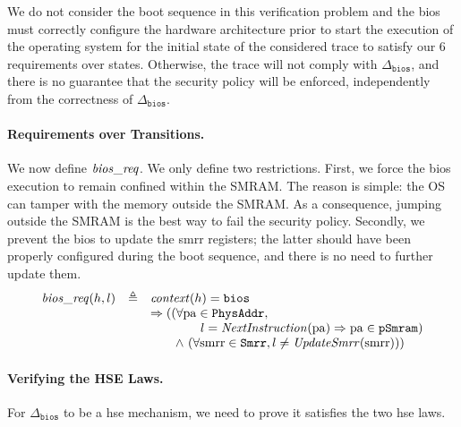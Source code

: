 We do not consider the boot sequence in this verification problem and the
\ac{bios} must correctly configure the hardware architecture prior to start the
execution of the operating system for the initial state of the considered trace
to satisfy our 6 requirements over states.
%
Otherwise, the trace will not comply with \( \Delta_{\mathtt{bios}} \), and
there is no guarantee that the security policy will be enforced, independently
from the correctness of \( \Delta_{\mathtt{bios}} \).


\paragraph{Requirements over Transitions.}
%
We now define $\mathit{bios\_req}$.
%
We only define two restrictions.
%
First, we force the \ac{bios} execution to remain confined within the SMRAM.
%
The reason is simple: the OS can tamper with the memory outside the SMRAM.
%
As a consequence, jumping outside the SMRAM is the best way to fail the security
policy.
%
Secondly, we prevent the \ac{bios} to update the \ac{smrr} registers;
%
the latter should have been properly configured during the boot sequence, and
there is no need to further update them.
%
\[
  \begin{array}{rcl}
    \func{bios\_req}(h, l)
    & \triangleq
    & \func{context}(h) = \val{bios} \\
    & %
    & \Rightarrow ((\forall \var{pa} \in \texttt{PhysAddr}, \\
    & %
    & \qquad\qquad l = \func{NextInstruction}(\var{pa})
      \Rightarrow \var{pa} \in \texttt{pSmram}) \\
    & %
    & \qquad\wedge~(\forall \var{smrr} \in \texttt{Smrr}, l \neq \func{UpdateSmrr}(\var{smrr})))
  \end{array}
\]

\paragraph{Verifying the HSE Laws.}
%
For $\Delta_{\mathtt{bios}}$ to be a \ac{hse} mechanism, we need to prove it
satisfies the two \ac{hse} laws.

